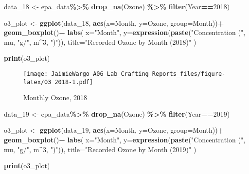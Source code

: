 \documentclass[
]{article}
\newenvironment{Shaded}{\begin{snugshade}}{\end{snugshade}}
\newcommand{\AttributeTok}[1]{\textcolor[rgb]{0.13,0.29,0.53}{#1}}
\newcommand{\DecValTok}[1]{\textcolor[rgb]{0.00,0.00,0.81}{#1}}
\newcommand{\FunctionTok}[1]{\textcolor[rgb]{0.13,0.29,0.53}{\textbf{#1}}}
\newcommand{\NormalTok}[1]{#1}
\newcommand{\OtherTok}[1]{\textcolor[rgb]{0.56,0.35,0.01}{#1}}
\newcommand{\SpecialCharTok}[1]{\textcolor[rgb]{0.81,0.36,0.00}{\textbf{#1}}}
\newcommand{\StringTok}[1]{\textcolor[rgb]{0.31,0.60,0.02}{#1}}
\begin{document}
\begin{Shaded}
\begin{Highlighting}[]
\NormalTok{data\_18 }\OtherTok{\textless{}{-}}\NormalTok{ epa\_data}\SpecialCharTok{\%\textgreater{}\%} 
  \FunctionTok{drop\_na}\NormalTok{(Ozone) }\SpecialCharTok{\%\textgreater{}\%}
  \FunctionTok{filter}\NormalTok{(Year}\SpecialCharTok{==}\DecValTok{2018}\NormalTok{)}

\NormalTok{o3\_plot }\OtherTok{\textless{}{-}} \FunctionTok{ggplot}\NormalTok{(data\_18, }\FunctionTok{aes}\NormalTok{(}\AttributeTok{x=}\NormalTok{Month, }\AttributeTok{y=}\NormalTok{Ozone, }\AttributeTok{group=}\NormalTok{Month))}\SpecialCharTok{+}
  \FunctionTok{geom\_boxplot}\NormalTok{()}\SpecialCharTok{+}
  \FunctionTok{labs}\NormalTok{(}
    \AttributeTok{x=}\StringTok{"Month"}\NormalTok{,}
    \AttributeTok{y=}\FunctionTok{expression}\NormalTok{(}\FunctionTok{paste}\NormalTok{(}\StringTok{"Concentration ("}\NormalTok{, mu, }\StringTok{"g/"}\NormalTok{, m}\SpecialCharTok{\^{}}\DecValTok{3}\NormalTok{, }\StringTok{")"}\NormalTok{)),}
    \AttributeTok{title=}\StringTok{"Recorded Ozone by Month (2018)"}
\NormalTok{  )}
                  
\FunctionTok{print}\NormalTok{(o3\_plot)}
\end{Highlighting}
\end{Shaded}

\begin{figure}
\centering
\texttt{[image: JaimieWargo\_A06\_Lab\_Crafting\_Reports\_files/figure-latex/O3 2018-1.pdf]}
\caption{Monthly Ozone, 2018}
\end{figure}

\begin{Shaded}
\begin{Highlighting}[]
\NormalTok{data\_19 }\OtherTok{\textless{}{-}}\NormalTok{ epa\_data}\SpecialCharTok{\%\textgreater{}\%} 
  \FunctionTok{drop\_na}\NormalTok{(Ozone) }\SpecialCharTok{\%\textgreater{}\%}
  \FunctionTok{filter}\NormalTok{(Year}\SpecialCharTok{==}\DecValTok{2019}\NormalTok{)}

\NormalTok{o3\_plot }\OtherTok{\textless{}{-}} \FunctionTok{ggplot}\NormalTok{(data\_19, }\FunctionTok{aes}\NormalTok{(}\AttributeTok{x=}\NormalTok{Month, }\AttributeTok{y=}\NormalTok{Ozone, }\AttributeTok{group=}\NormalTok{Month))}\SpecialCharTok{+}
  \FunctionTok{geom\_boxplot}\NormalTok{()}\SpecialCharTok{+}
  \FunctionTok{labs}\NormalTok{(}
    \AttributeTok{x=}\StringTok{"Month"}\NormalTok{,}
    \AttributeTok{y=}\FunctionTok{expression}\NormalTok{(}\FunctionTok{paste}\NormalTok{(}\StringTok{"Concentration ("}\NormalTok{, mu, }\StringTok{"g/"}\NormalTok{, m}\SpecialCharTok{\^{}}\DecValTok{3}\NormalTok{, }\StringTok{")"}\NormalTok{)),}
    \AttributeTok{title=}\StringTok{"Recorded Ozone by Month (2019)"}
\NormalTok{  )}
                  
\FunctionTok{print}\NormalTok{(o3\_plot)}
\end{Highlighting}
\end{Shaded}
\end{document}
